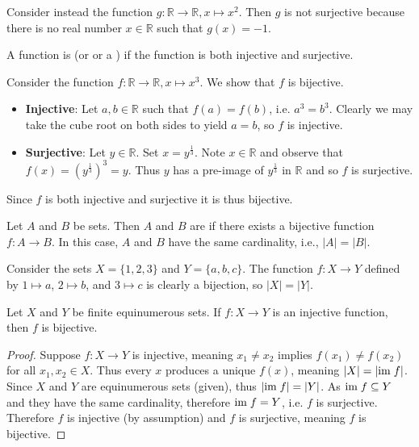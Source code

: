 \begin{example}
    Consider instead the function $g: \mathbb{R} \to \mathbb{R}, x \mapsto x^2$. Then $g$ is not surjective because there is no real number $x \in \mathbb{R}$ such that $g(x) = -1$.
\end{example}

\begin{definition}
    A function is  (or  or a ) if the function is both injective and surjective.
\end{definition}

\begin{example}
    Consider the function $f: \mathbb{R} \to \mathbb{R}, x \mapsto x^3$. We show that $f$ is bijective.
    \begin{itemize}
        \item \textbf{Injective}: Let $a, b \in \mathbb{R}$ such that $f(a) = f(b)$, i.e. $a^3 = b^3$. Clearly we may take the cube root on both sides to yield $a = b$, so $f$ is injective.
        \item \textbf{Surjective}: Let $y \in \mathbb{R}$. Set $x=y^{\frac13}$. Note $x \in \mathbb{R}$ and observe that $f(x) = \left(y^{\frac13}\right)^3 = y$. Thus $y$ has a pre-image of $y^{\frac13}$ in $\mathbb{R}$ and so $f$ is surjective.
    \end{itemize}
    Since $f$ is both injective and surjective it is thus bijective.
\end{example}

\begin{definition}
    Let $A$ and $B$ be sets. Then $A$ and $B$ are  if there exists a bijective function $f: A \to B$. In this case, $A$ and $B$ have the same cardinality, i.e., $|A| = |B|$.
\end{definition}

\begin{example}
    Consider the sets $X = \{1, 2, 3\}$ and $Y = \{a, b, c\}$. The function $f: X \to Y$ defined by $1 \mapsto a$, $2 \mapsto b$, and $3 \mapsto c$ is clearly a bijection, so $|X| = |Y|$.
\end{example}

\begin{proposition}
    Let $X$ and $Y$ be finite equinumerous sets. If $f: X \to Y$ is an injective function, then $f$ is bijective.
\end{proposition}
\begin{proof}
    Suppose $f: X \to Y$ is injective, meaning $x_1 \neq x_2$ implies $f(x_1) \neq f(x_2)$ for all $x_1, x_2 \in X$. Thus every $x$ produces a unique $f(x)$, meaning $|X| = |\mathrm{im}\; f|$. Since $X$ and $Y$ are equinumerous sets (given), thus $|\mathrm{im}\; f| = |Y|$. As $\mathrm{im}\; f \subseteq Y$ and they have the same cardinality, therefore $\mathrm{im}\; f = Y$, i.e. $f$ is surjective. Therefore $f$ is injective (by assumption) and $f$ is surjective, meaning $f$ is bijective.
\end{proof}

